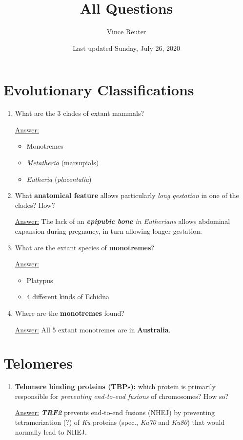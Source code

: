 \documentclass{article}
\title{All Questions}
\author{Vince Reuter}
\date{Last updated Sunday, July 26, 2020}
\newenvironment{QandA}{\begin{enumerate}[label=\bfseries Q\arabic*.]}
                       {\end{enumerate}}
\newenvironment{answered}{\par\normalfont\underline{Answer:}}{}
\begin{document}
\maketitle

\tableofcontents

\section{Evolutionary Classifications}
\begin{QandA}
  \item{What are the 3 clades of extant mammals?}
    \begin{answered}
    \begin{itemize}
      \item{Monotremes}
      \item{\textit{Metatheria} (marsupials)}
      \item{\textit{Eutheria} (\textit{placentalia})}
    \end{itemize}
    \end{answered}
  \item{What \textbf{anatomical feature} allows particularly \textit{long gestation} in one of the clades? How?}
    \begin{answered}
    The lack of an \textit{\textbf{epipubic bone} in Eutherians} allows abdominal expansion during pregnancy, in turn allowing longer gestation.
    \end{answered}
  \item{What are the extant species of \textbf{monotremes}?}
    \begin{answered}
    \begin{itemize}
      \item{Platypus}
      \item{4 different kinds of Echidna}
    \end{itemize}
    \end{answered}
  \item{Where are the \textbf{monotremes} found?}
    \begin{answered}
    All 5 extant monotremes are in \textbf{Australia}.
    \end{answered}
\end{QandA}
\section{Telomeres}
\begin{QandA}
  \item{\textbf{Telomere binding proteins (TBPs):} which protein is primarily responsible for \textit{preventing end-to-end fusions} of chromosomes? How so?}
    \begin{answered}
    \textbf{\textit{TRF2}} prevents end-to-end fusions (NHEJ) by preventing tetramerization (?) of \textit{Ku} proteins (spec., \textit{Ku70} and \textit{Ku80}) that would normally lead to NHEJ.
    \end{answered}
\end{QandA}
\end{document}
